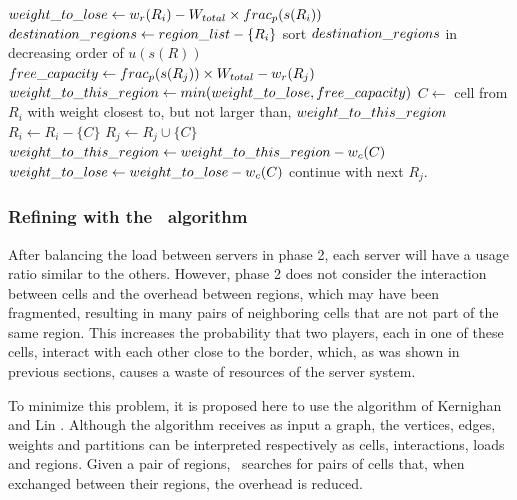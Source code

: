 \begin{algorithm}
\caption{\bfa}
\label{alg:bfa}
\begin{algorithmic}[1]

			\STATE $weight\_to\_lose \leftarrow w_r(R_i) - W_{total} \times frac_p(s(R_i))$ \label{alg:bfa:wlose}
			\STATE $destination\_regions \leftarrow region\_list - \{R_i\}$
			\STATE sort $destination\_regions$ in decreasing order of $u(s(R))$ \label{alg:bfa:sort}
				 \STATE $free\_capacity \leftarrow frac_p(s(R_j)) \times W_{total} - w_r(R_j)$ \label{alg:bfa:freecap}
				 \STATE $weight\_to\_this\_region \leftarrow min(weight\_to\_lose, free\_capacity)$ \label{alg:bfa:min}
				 			 \STATE $C \leftarrow$ cell from $R_i$ with weight closest to, but not larger than, $weight\_to\_this\_region$ \label{alg:bfa:bestfit}
				 			 \STATE $R_i \leftarrow R_i - \{C\}$
				 			 \STATE $R_j \leftarrow R_j \cup \{C\}$
				 			 \STATE $weight\_to\_this\_region \leftarrow weight\_to\_this\_region - w_c(C)$
				 			 \STATE $weight\_to\_lose \leftarrow weight\_to\_lose - w_c(C)$
				 		\ELSE
				 			 \STATE continue with next $R_j$. \label{alg:bfa:continue}
				 		\ENDIF
				 \ENDWHILE
			\ENDFOR			
	 \ENDFOR

\end{algorithmic}
\end{algorithm}


\subsubsection{Refining with the \kl\ algorithm}
\label{sec:alg:kl}
	
After balancing the load between servers in phase 2, each server will have a usage ratio similar to the others. However, phase 2 does not consider the interaction between cells and the overhead between regions, which may have been fragmented, resulting in many pairs of neighboring cells that are not part of the same region. This increases the probability that two players, each in one of these cells, interact with each other close to the border, which, as was shown in previous sections, causes a waste of resources of the server system.

To minimize this problem, it is proposed here to use the algorithm of Kernighan and Lin \cite{kernighan1970ehp}. Although the algorithm receives as input a graph, the vertices, edges, weights and partitions can be interpreted respectively as cells, interactions, loads and regions. Given a pair of regions, \kl\ searches for pairs of cells that, when exchanged between their regions, the overhead is reduced.

